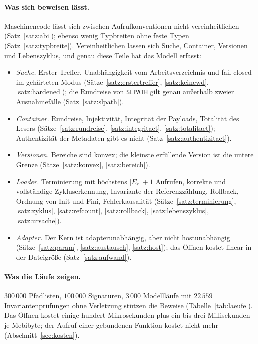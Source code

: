 \documentclass[a4paper,12pt,twoside]{report}
\DeclareRobustCommand{\_}{\ifmmode\mbox{\textunderscore}\else\textunderscore\allowbreak{}\fi}
\theoremstyle{definition}
\begin{document}
\paragraph{Was sich beweisen lässt.} Maschinencode lässt sich zwischen Aufrufkonventionen nicht vereinheitlichen (Satz~\ref{satz:abi}); ebenso wenig Typbreiten ohne feste Typen (Satz~\ref{satz:typbreite}). Vereinheitlichen lassen sich Suche, Container, Versionen und Lebenszyklus, und genau diese Teile hat das Modell erfasst:
\begin{itemize}
	\item \emph{Suche.} Erster Treffer, Unabhängigkeit vom Arbeitsverzeichnis und fail closed im gehärteten Modus (Sätze~\ref{satz:erstertreffer}, \ref{satz:keincwd}, \ref{satz:hardened}); die Rundreise von \texttt{SL\_PATH} gilt genau außerhalb zweier Ausnahmefälle (Satz~\ref{satz:slpath}).
	\item \emph{Container.} Rundreise, Injektivität, Integrität der Payloads, Totalität des Lesers (Sätze~\ref{satz:rundreise}, \ref{satz:integritaet}, \ref{satz:totalitaet}); Authentizität der Metadaten gibt es nicht (Satz~\ref{satz:authentizitaet}).
	\item \emph{Versionen.} Bereiche sind konvex; die kleinste erfüllende Version ist die untere Grenze (Sätze~\ref{satz:konvex}, \ref{satz:bereich}).
	\item \emph{Loader.} Terminierung mit höchstens $|E_r|+1$ Aufrufen, korrekte und vollständige Zykluserkennung, Invariante der Referenzzählung, Rollback, Ordnung von Init und Fini, Fehlerkausalität (Sätze~\ref{satz:terminierung}, \ref{satz:zyklus}, \ref{satz:refcount}, \ref{satz:rollback}, \ref{satz:lebenszyklus}, \ref{satz:ursache}).
	\item \emph{Adapter.} Der Kern ist adapterunabhängig, aber nicht hostunabhängig (Sätze~\ref{satz:param}, \ref{satz:austausch}, \ref{satz:host}); das Öffnen kostet linear in der Dateigröße (Satz~\ref{satz:aufwand}).
\end{itemize}

\paragraph{Was die Läufe zeigen.} $300\,000$ Pfadlisten, $100\,000$ Signaturen, $3\,000$ Modellläufe mit $22\,559$ Invariantenprüfungen ohne Verletzung stützen die Beweise (Tabelle~\ref{tab:laeufe}). Das Öffnen kostet einige hundert Mikrosekunden plus ein bis drei Millisekunden je Mebibyte; der Aufruf einer gebundenen Funktion kostet nicht mehr (Abschnitt~\ref{sec:kosten}).
\end{document}
